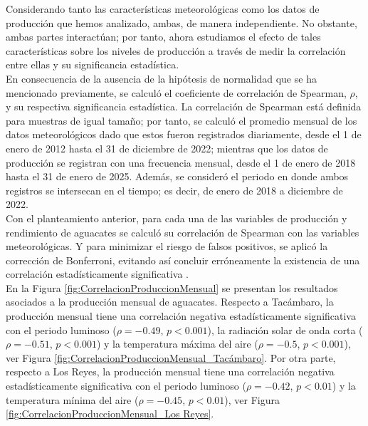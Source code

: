 Considerando tanto las características meteorológicas como los datos de producción que hemos analizado, ambas, de manera independiente. No obstante, ambas partes interactúan; por tanto, ahora estudiamos el efecto de tales características sobre los niveles de producción a través de medir la correlación entre ellas y su significancia estadística.\\


En consecuencia de la ausencia de la hipótesis de normalidad que se ha mencionado previamente, se calculó el coeficiente de correlación de Spearman, $\rho$, y su respectiva significancia estadística. La correlación de Spearman está definida para muestras de igual tamaño; por tanto, se calculó el promedio mensual de los datos meteorológicos dado que estos fueron registrados diariamente, desde el 1 de enero de 2012 hasta el 31 de diciembre de 2022; mientras que los datos de producción se registran con una frecuencia mensual, desde el 1 de enero de 2018 hasta el 31 de enero de 2025. Además, se consideró el periodo en donde ambos registros se intersecan en el tiempo; es decir, de enero de 2018 a diciembre de 2022.\\

Con el planteamiento anterior, para cada una de las variables de producción y rendimiento de aguacates se calculó su correlación de Spearman con las variables meteorológicas. Y para minimizar el riesgo de falsos positivos, se aplicó la corrección de Bonferroni, evitando así concluir erróneamente la existencia de una correlación estadísticamente significativa \cite{Curtin_1998}.\\

En la Figura \ref{fig:CorrelacionProduccionMensual} se presentan los resultados asociados a la producción mensual de aguacates. Respecto a Tacámbaro, la producción mensual tiene una correlación negativa estadísticamente significativa con el periodo luminoso ($\rho =-0.49$, $p < 0.001$), la radiación solar de onda corta ($\rho =-0.51$, $p<0.001$) y la temperatura máxima del aire ($\rho =-0.5$, $p<0.001$), ver Figura \ref{fig:CorrelacionProduccionMensual_Tacámbaro}. Por otra parte, respecto a Los Reyes, la producción mensual tiene una correlación negativa estadísticamente significativa con el periodo luminoso ($\rho =-0.42$, $p < 0.01$) y la temperatura mínima del aire ($\rho =-0.45$, $p<0.01$), ver Figura \ref{fig:CorrelacionProduccionMensual_Los Reyes}.\\

